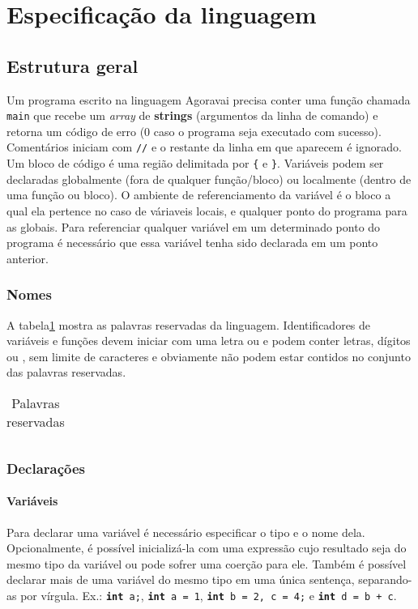 \section{Especificação da linguagem}
\label{sec:estrutura-geral}

\subsection{Estrutura geral}
\label{subsec:estrutura-geral}
Um programa escrito na linguagem Agoravai precisa conter uma função chamada \texttt{main} que recebe um
\textit{array} de \textbf{strings} (argumentos da linha de comando) e retorna um código de erro (0 caso o programa
seja executado com sucesso).
Comentários iniciam com \texttt{//} e o restante da linha em que aparecem é ignorado.
Um bloco de código é uma região delimitada por \texttt{\{} e \texttt{\}}.
Variáveis podem ser declaradas globalmente (fora de qualquer função/bloco) ou localmente (dentro de uma função ou
bloco).
O ambiente de referenciamento da variável é o bloco a qual ela pertence no caso de váriaveis locais, e qualquer
ponto do programa para as globais.
Para referenciar qualquer variável em um determinado ponto do programa é necessário que essa variável tenha sido
declarada em um ponto anterior.

\subsubsection{Nomes}
A tabela\ref{tab:palavras-reservadas} mostra as palavras reservadas da linguagem.
Identificadores de variáveis e funções devem iniciar com uma letra ou \texttt{\textunderscore} e podem conter
letras, dígitos ou \texttt{\textunderscore}, sem limite de caracteres e obviamente não podem estar contidos no
conjunto das palavras reservadas.
\begin{table}[]
    \centering
    \begin{tabular}{ccccc}
        
    \end{tabular}
    \caption{Palavras reservadas}
    \label{tab:palavras-reservadas}
\end{table}

\subsubsection{Declarações}
\label{sec:declaracoes}

\paragraph{Variáveis} Para declarar uma variável é necessário especificar o tipo e o nome dela.
Opcionalmente, é possível inicializá-la com uma expressão cujo resultado seja do mesmo tipo da variável ou pode
sofrer uma coerção para ele.
Também é possível declarar mais de uma variável do mesmo tipo em uma única sentença, separando-as por vírgula.
Ex.: \texttt{\textbf{int} a;}, \texttt{\textbf{int} a = 1}, \texttt{\textbf{int} b = 2, c = 4;} e
\texttt{\textbf{int} d = b + c}.


